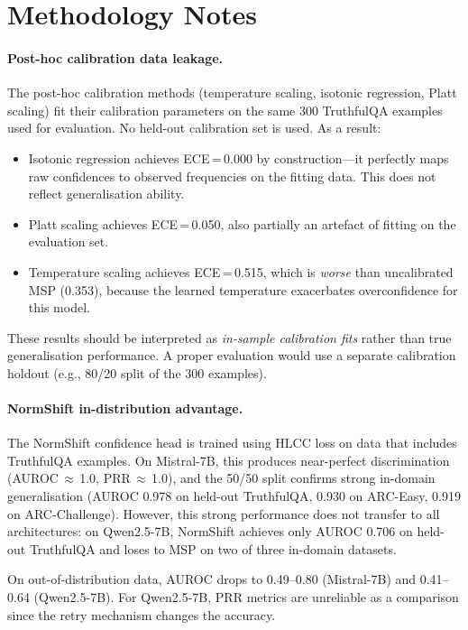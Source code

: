 \documentclass[11pt,a4paper]{article}
\begin{document}
\section{Methodology Notes}
\label{app:methodology-notes}

\paragraph{Post-hoc calibration data leakage.}
The post-hoc calibration methods (temperature scaling, isotonic
regression, Platt scaling) fit their calibration parameters on the same
300 TruthfulQA examples used for evaluation.  No held-out calibration
set is used.  As a result:
\begin{itemize}[nosep]
  \item Isotonic regression achieves ECE\,=\,0.000 by construction---it
        perfectly maps raw confidences to observed frequencies on the
        fitting data.  This does not reflect generalisation ability.
  \item Platt scaling achieves ECE\,=\,0.050, also partially an artefact
        of fitting on the evaluation set.
  \item Temperature scaling achieves ECE\,=\,0.515, which is \emph{worse}
        than uncalibrated MSP (0.353), because the learned temperature
        exacerbates overconfidence for this model.
\end{itemize}

These results should be interpreted as \emph{in-sample calibration
fits} rather than true generalisation performance.  A proper evaluation
would use a separate calibration holdout (e.g., 80/20 split of the 300
examples).

\paragraph{NormShift in-distribution advantage.}
The NormShift confidence head is trained using HLCC loss on data that
includes TruthfulQA examples.  On Mistral-7B, this produces
near-perfect discrimination (AUROC\,$\approx$\,1.0,
PRR\,$\approx$\,1.0), and the 50/50 split confirms strong in-domain
generalisation (AUROC 0.978 on held-out TruthfulQA, 0.930 on ARC-Easy,
0.919 on ARC-Challenge).  However, this strong performance does not
transfer to all architectures: on Qwen2.5-7B, NormShift achieves only
AUROC 0.706 on held-out TruthfulQA and loses to MSP on two of three
in-domain datasets.

On out-of-distribution data, AUROC drops to 0.49--0.80 (Mistral-7B)
and 0.41--0.64 (Qwen2.5-7B).  For Qwen2.5-7B, PRR metrics are
unreliable as a comparison since the retry mechanism changes the
accuracy.
\end{document}
